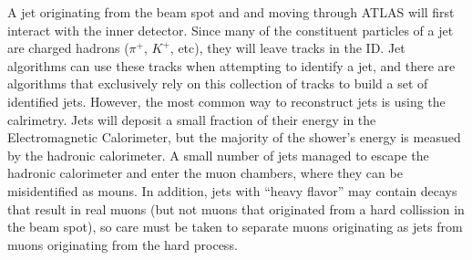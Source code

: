A jet originating from the beam spot and and moving through ATLAS will first interact with the inner detector.  Since many of the constituent particles of a jet are charged hadrons ($\pi^{+}$, $K^{+}$, etc), they will leave tracks in the ID.
Jet algorithms can use these tracks when attempting to identify a jet, and there are algorithms that exclusively rely on this collection of tracks to build a set of identified jets.
However, the most common way to reconstruct jets is using the calrimetry.
Jets will deposit a small fraction of their energy in the Electromagnetic Calorimeter, but the majority of the shower's energy is measued by the hadronic calorimeter.
A small number of jets managed to escape the hadronic calorimeter and enter the muon chambers, where they can be misidentified as mouns.
In addition, jets with ``heavy flavor'' may contain decays that result in real muons (but not muons that originated from a hard collission in the beam spot), so care must be taken to separate muons originating as jets from muons originating from the hard process.

